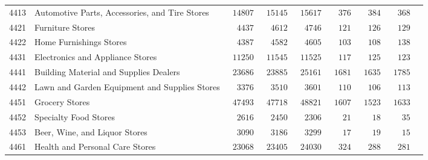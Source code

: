 \documentclass[9pt, oneside]{article}   	%
\begin{document}
\begin{longtable}{lp{3 in}ccccccc}
4413  & Automotive Parts, Accessories, and Tire Stores & $\phantom{0}14807$ & $\phantom{0}15145$ & $\phantom{0}15617$ & $\phantom{00}376$ & $\phantom{00}384$ & $\phantom{00}368$ \\
4421  & Furniture Stores & $\phantom{00}4437$ & $\phantom{00}4612$ & $\phantom{00}4746$ & $\phantom{00}121$ & $\phantom{00}126$ & $\phantom{00}129$ \\
4422  & Home Furnishings Stores & $\phantom{00}4387$ & $\phantom{00}4582$ & $\phantom{00}4605$ & $\phantom{00}103$ & $\phantom{00}108$ & $\phantom{00}138$ \\
4431  & Electronics and Appliance Stores & $\phantom{0}11250$ & $\phantom{0}11545$ & $\phantom{0}11525$ & $\phantom{00}117$ & $\phantom{00}125$ & $\phantom{00}123$ \\

4441  & Building Material and Supplies Dealers & $\phantom{0}23686$ & $\phantom{0}23885$ & $\phantom{0}25161$ & $\phantom{0}1681$ & $\phantom{0}1635$ & $\phantom{0}1785$ \\
4442  & Lawn and Garden Equipment and Supplies Stores & $\phantom{00}3376$ & $\phantom{00}3510$ & $\phantom{00}3601$ & $\phantom{00}110$ & $\phantom{00}106$ & $\phantom{00}113$ \\
4451  & Grocery Stores & $\phantom{0}47493$ & $\phantom{0}47718$ & $\phantom{0}48821$ & $\phantom{0}1607$ & $\phantom{0}1523$ & $\phantom{0}1633$ \\
4452  & Specialty Food Stores & $\phantom{00}2616$ & $\phantom{00}2450$ & $\phantom{00}2306$ & $\phantom{000}21$ & $\phantom{000}18$ & $\phantom{000}35$ \\
4453  & Beer, Wine, and Liquor Stores & $\phantom{00}3090$ & $\phantom{00}3186$ & $\phantom{00}3299$ & $\phantom{000}17$ & $\phantom{000}19$ & $\phantom{000}15$ \\
4461  & Health and Personal Care Stores & $\phantom{0}23068$ & $\phantom{0}23405$ & $\phantom{0}24030$ & $\phantom{00}324$ & $\phantom{00}288$ & $\phantom{00}281$ \\


\end{longtable}
\end{document}
